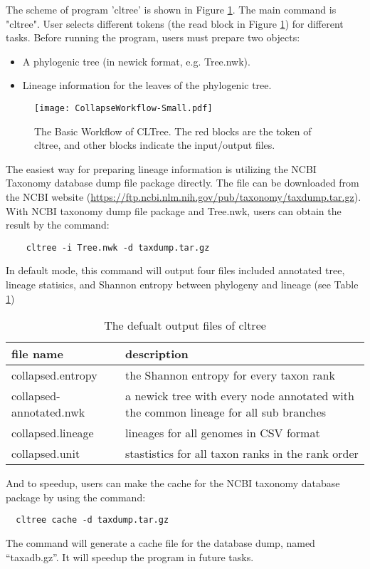 \documentclass[12pt,a4paper]{article}
\begin{document}
The scheme of program 'cltree' is shown in Figure \ref{workflow}. The main command is "cltree". User selects different tokens (the read block in Figure \ref{workflow}) for different tasks. Before running the program, users must prepare two objects:
\begin{itemize}
	\item A phylogenic tree (in newick format, e.g. Tree.nwk).
	\item Lineage information for the leaves of the phylogenic tree.
\end{itemize}
\begin{figure}[!h]
	\centering
	\texttt{[image: CollapseWorkflow-Small.pdf]}
	\caption{The Basic Workflow of CLTree. The red blocks are the token of cltree, and other blocks indicate the input/output files.}
	\label{workflow}
\end{figure}

The easiest way for preparing lineage information is utilizing the NCBI Taxonomy database dump file package directly. The file can be downloaded from the NCBI website (\url{https://ftp.ncbi.nlm.nih.gov/pub/taxonomy/taxdump.tar.gz}). With NCBI taxonomy dump file package and Tree.nwk, users can obtain the result by the command:
\begin{verbatim}
	cltree -i Tree.nwk -d taxdump.tar.gz
\end{verbatim}
In default mode, this command will output four files included annotated tree, lineage statisics, and Shannon entropy between phylogeny and lineage (see Table \ref{output})
\begin{table}[h]
  \caption{The defualt output files of cltree}
  \label{output}
  \centering
  \begin{tabular}{l p{}}
  \hline\hline
  file name & description \\
  \hline
  collapsed.entropy  & the Shannon entropy for every taxon rank \\
  collapsed-annotated.nwk & a newick tree with every node annotated with the common lineage for all sub branches \\
  collapsed.lineage & lineages for all genomes in CSV format\\
  collapsed.unit & stastistics for all taxon ranks in the rank order\\
  \hline\hline
  \end{tabular}
\end{table}

And to speedup, users can make the cache for the NCBI taxonomy database package by using the  command:
\begin{verbatim}
  cltree cache -d taxdump.tar.gz 
\end{verbatim}
The command will generate a cache file for the database dump, named ``taxadb.gz''. It will speedup the program in future tasks.
\end{document}
